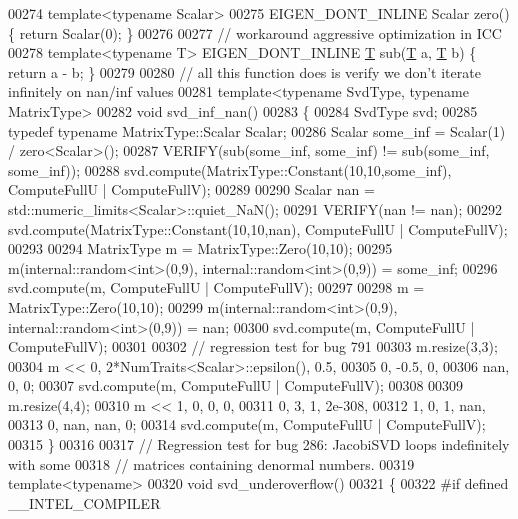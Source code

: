 \begin{DoxyCode}
00274 \textcolor{keyword}{template}<\textcolor{keyword}{typename} Scalar>
00275 EIGEN\_DONT\_INLINE Scalar zero() \{ \textcolor{keywordflow}{return} Scalar(0); \}
00276 
00277 \textcolor{comment}{// workaround aggressive optimization in ICC}
00278 \textcolor{keyword}{template}<\textcolor{keyword}{typename} T> EIGEN\_DONT\_INLINE  \hyperlink{group___sparse_core___module_class_eigen_1_1_triplet}{T} sub(\hyperlink{group___sparse_core___module_class_eigen_1_1_triplet}{T} a, \hyperlink{group___sparse_core___module_class_eigen_1_1_triplet}{T} b) \{ \textcolor{keywordflow}{return} a - b; \}
00279 
00280 \textcolor{comment}{// all this function does is verify we don't iterate infinitely on nan/inf values}
00281 \textcolor{keyword}{template}<\textcolor{keyword}{typename} SvdType, \textcolor{keyword}{typename} MatrixType>
00282 \textcolor{keywordtype}{void} svd\_inf\_nan()
00283 \{
00284   SvdType svd;
00285   \textcolor{keyword}{typedef} \textcolor{keyword}{typename} MatrixType::Scalar Scalar;
00286   Scalar some\_inf = Scalar(1) / zero<Scalar>();
00287   VERIFY(sub(some\_inf, some\_inf) != sub(some\_inf, some\_inf));
00288   svd.compute(MatrixType::Constant(10,10,some\_inf), ComputeFullU | ComputeFullV);
00289 
00290   Scalar nan = std::numeric\_limits<Scalar>::quiet\_NaN();
00291   VERIFY(nan != nan);
00292   svd.compute(MatrixType::Constant(10,10,nan), ComputeFullU | ComputeFullV);
00293 
00294   MatrixType m = MatrixType::Zero(10,10);
00295   m(internal::random<int>(0,9), internal::random<int>(0,9)) = some\_inf;
00296   svd.compute(m, ComputeFullU | ComputeFullV);
00297 
00298   m = MatrixType::Zero(10,10);
00299   m(internal::random<int>(0,9), internal::random<int>(0,9)) = nan;
00300   svd.compute(m, ComputeFullU | ComputeFullV);
00301   
00302   \textcolor{comment}{// regression test for bug 791}
00303   m.resize(3,3);
00304   m << 0,    2*NumTraits<Scalar>::epsilon(),  0.5,
00305        0,   -0.5,                             0,
00306        nan,  0,                               0;
00307   svd.compute(m, ComputeFullU | ComputeFullV);
00308   
00309   m.resize(4,4);
00310   m <<  1, 0, 0, 0,
00311         0, 3, 1, 2e-308,
00312         1, 0, 1, nan,
00313         0, nan, nan, 0;
00314   svd.compute(m, ComputeFullU | ComputeFullV);
00315 \}
00316 
00317 \textcolor{comment}{// Regression test for bug 286: JacobiSVD loops indefinitely with some}
00318 \textcolor{comment}{// matrices containing denormal numbers.}
00319 \textcolor{keyword}{template}<\textcolor{keyword}{typename}>
00320 \textcolor{keywordtype}{void} svd\_underoverflow()
00321 \{
00322 \textcolor{preprocessor}{#if defined \_\_INTEL\_COMPILER}

\end{DoxyCode}
